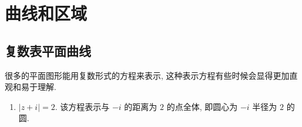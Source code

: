 \section{曲线和区域}

\subsection{复数表平面曲线}

很多的平面图形能用复数形式的方程来表示, 这种表示方程有些时候会显得更加直观和易于理解.

\begin{example}
  \begin{enumerate}
    \item $|z+i|=2$. 该方程表示与 $-i$ 的距离为 $2$ 的点全体, 即圆心为 $-i$ 半径为 $2$ 的圆.
    

\end{enumerate}
\end{example}
